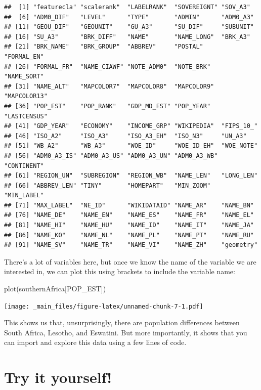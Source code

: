 \documentclass[
]{book}
\newenvironment{Shaded}{\begin{snugshade}}{\end{snugshade}}
\newcommand{\FunctionTok}[1]{\textcolor[rgb]{0.00,0.00,0.00}{#1}}
\newcommand{\NormalTok}[1]{#1}
\newcommand{\StringTok}[1]{\textcolor[rgb]{0.31,0.60,0.02}{#1}}
\begin{document}
\begin{verbatim}
##  [1] "featurecla" "scalerank"  "LABELRANK"  "SOVEREIGNT" "SOV_A3"    
##  [6] "ADM0_DIF"   "LEVEL"      "TYPE"       "ADMIN"      "ADM0_A3"   
## [11] "GEOU_DIF"   "GEOUNIT"    "GU_A3"      "SU_DIF"     "SUBUNIT"   
## [16] "SU_A3"      "BRK_DIFF"   "NAME"       "NAME_LONG"  "BRK_A3"    
## [21] "BRK_NAME"   "BRK_GROUP"  "ABBREV"     "POSTAL"     "FORMAL_EN" 
## [26] "FORMAL_FR"  "NAME_CIAWF" "NOTE_ADM0"  "NOTE_BRK"   "NAME_SORT" 
## [31] "NAME_ALT"   "MAPCOLOR7"  "MAPCOLOR8"  "MAPCOLOR9"  "MAPCOLOR13"
## [36] "POP_EST"    "POP_RANK"   "GDP_MD_EST" "POP_YEAR"   "LASTCENSUS"
## [41] "GDP_YEAR"   "ECONOMY"    "INCOME_GRP" "WIKIPEDIA"  "FIPS_10_"  
## [46] "ISO_A2"     "ISO_A3"     "ISO_A3_EH"  "ISO_N3"     "UN_A3"     
## [51] "WB_A2"      "WB_A3"      "WOE_ID"     "WOE_ID_EH"  "WOE_NOTE"  
## [56] "ADM0_A3_IS" "ADM0_A3_US" "ADM0_A3_UN" "ADM0_A3_WB" "CONTINENT" 
## [61] "REGION_UN"  "SUBREGION"  "REGION_WB"  "NAME_LEN"   "LONG_LEN"  
## [66] "ABBREV_LEN" "TINY"       "HOMEPART"   "MIN_ZOOM"   "MIN_LABEL" 
## [71] "MAX_LABEL"  "NE_ID"      "WIKIDATAID" "NAME_AR"    "NAME_BN"   
## [76] "NAME_DE"    "NAME_EN"    "NAME_ES"    "NAME_FR"    "NAME_EL"   
## [81] "NAME_HI"    "NAME_HU"    "NAME_ID"    "NAME_IT"    "NAME_JA"   
## [86] "NAME_KO"    "NAME_NL"    "NAME_PL"    "NAME_PT"    "NAME_RU"   
## [91] "NAME_SV"    "NAME_TR"    "NAME_VI"    "NAME_ZH"    "geometry"
\end{verbatim}

There's a lot of variables here, but once we know the name of the variable we are interested in, we can plot this using brackets to include the variable name:

\begin{Shaded}
\begin{Highlighting}[]
\FunctionTok{plot}\NormalTok{(southernAfrica[}\StringTok{\textquotesingle{}POP\_EST\textquotesingle{}}\NormalTok{])}
\end{Highlighting}
\end{Shaded}

\texttt{[image: \_main\_files/figure-latex/unnamed-chunk-7-1.pdf]}

This shows us that, unsurprisingly, there are population differences between South Africa, Lesotho, and Eswatini. But more importantly, it shows that you can import and explore this data using a few lines of code.

\hypertarget{try-it-yourself}{%
\section{Try it yourself!}\label{try-it-yourself}}
\end{document}
